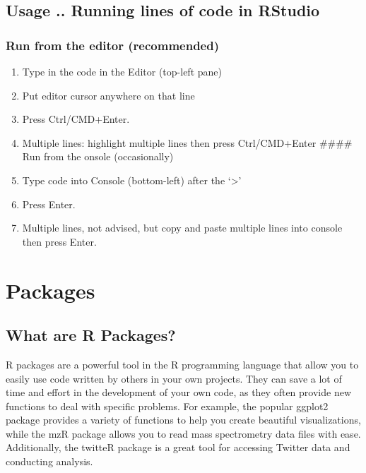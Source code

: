 \documentclass[
]{book}
\providecommand{\tightlist}{%
  \setlength{\itemsep}{0pt}\setlength{\parskip}{0pt}}
\begin{document}
\hypertarget{usage-..-running-lines-of-code-in-rstudio}{%
\subsection{Usage .. Running lines of code in RStudio}\label{usage-..-running-lines-of-code-in-rstudio}}

\hypertarget{run-from-the-editor-recommended}{%
\subsubsection{Run from the editor (recommended)}\label{run-from-the-editor-recommended}}

\begin{enumerate}
\def\labelenumi{\arabic{enumi}.}
\tightlist
\item
  Type in the code in the Editor (top-left pane)
\item
  Put editor cursor anywhere on that line
\item
  Press Ctrl/CMD+Enter.
\item
  Multiple lines: highlight multiple lines then press Ctrl/CMD+Enter \#\#\#\# Run from the onsole (occasionally)
\item
  Type code into Console (bottom-left) after the `\textgreater{}'
\item
  Press Enter.
\item
  Multiple lines, not advised, but copy and paste multiple lines into console then press Enter.
\end{enumerate}

\hypertarget{packages}{%
\section{Packages}\label{packages}}

\hypertarget{what-are-r-packages}{%
\subsection{What are R Packages?}\label{what-are-r-packages}}

R packages are a powerful tool in the R programming language that allow you to easily use code written by others in your own projects. They can save a lot of time and effort in the development of your own code, as they often provide new functions to deal with specific problems. For example, the popular ggplot2 package provides a variety of functions to help you create beautiful visualizations, while the mzR package allows you to read mass spectrometry data files with ease. Additionally, the twitteR package is a great tool for accessing Twitter data and conducting analysis.
\end{document}
